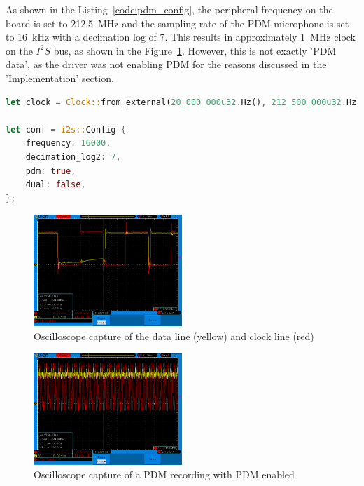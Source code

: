As shown in the Listing~\ref{code:pdm_config}, the peripheral frequency on the board is set to \SI{212.5}{\mega\hertz}
and the sampling rate of the PDM microphone is set to \SI{16}{\kilo\hertz} with a decimation log of 7.
This results in approximately \SI{1}{\mega\hertz} clock on the $I^2S$ bus, as shown in the Figure~\ref{fig:i2s_capture}.
However, this is not exactly 'PDM data', as the driver was not enabling PDM for the reasons discussed in the 'Implementation' section.

\begin{minipage}{\textwidth}
\begin{lstlisting}[style=colorEX,language=Rust,caption={Configuration of the board clock and the PDM driver},label={code:pdm_config}]
let clock = Clock::from_external(20_000_000u32.Hz(), 212_500_000u32.Hz());

let conf = i2s::Config {
    frequency: 16000,
    decimation_log2: 7,
    pdm: true,
    dual: false,
};
\end{lstlisting}
\end{minipage}

\begin{figure}[H]
    \begin{center}
        \includegraphics[width=0.5\textwidth]{figures/i2s_capture.png}
    \end{center}
    \caption[Oscilloscope capture of the data line (yellow) and clock line (red) of the microphone]{Oscilloscope capture of the data line (yellow) and clock line (red)}
    \label{fig:i2s_capture}
\end{figure}

\begin{figure}[H]
    \begin{center}
        \includegraphics[width=0.5\textwidth]{figures/pdm_broken.png}
    \end{center}
    \caption[Oscilloscope capture of a PDM recording with PDM enabled]{Oscilloscope capture of a PDM recording with PDM enabled}
    \label{fig:pdm_no_config}
\end{figure}

